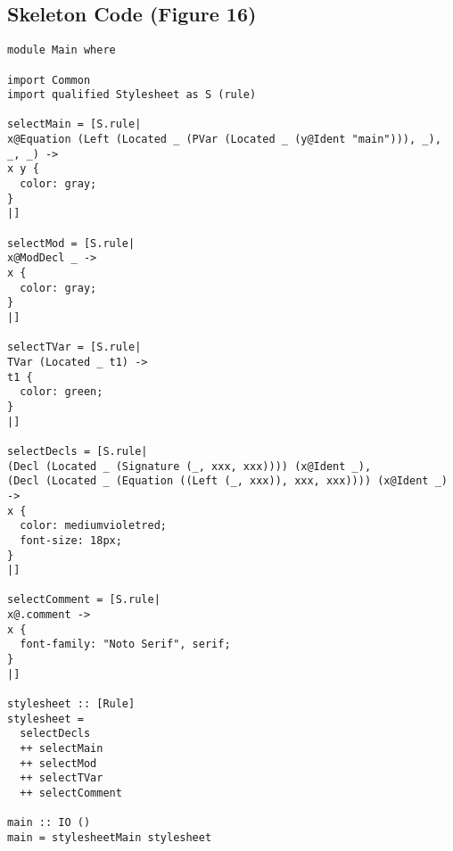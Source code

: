 \documentclass[acmsmall, screen]{acmart}
\begin{document}
\subsection{Skeleton Code (Figure 16)}
\label{sec:listing-skeleton-code}
{\scriptsize
\begin{verbatim}
module Main where

import Common
import qualified Stylesheet as S (rule)

selectMain = [S.rule|
x@Equation (Left (Located _ (PVar (Located _ (y@Ident "main"))), _), _, _) ->
x y {
  color: gray;
}
|]

selectMod = [S.rule|
x@ModDecl _ ->
x {
  color: gray;
}
|]

selectTVar = [S.rule|
TVar (Located _ t1) ->
t1 {
  color: green;
}
|]

selectDecls = [S.rule|
(Decl (Located _ (Signature (_, xxx, xxx)))) (x@Ident _),
(Decl (Located _ (Equation ((Left (_, xxx)), xxx, xxx)))) (x@Ident _) ->
x {
  color: mediumvioletred;
  font-size: 18px;
}
|]

selectComment = [S.rule|
x@.comment ->
x {
  font-family: "Noto Serif", serif;
}
|]

stylesheet :: [Rule]
stylesheet =
  selectDecls
  ++ selectMain
  ++ selectMod
  ++ selectTVar
  ++ selectComment

main :: IO ()
main = stylesheetMain stylesheet

\end{verbatim}}
\clearpage
\end{document}
